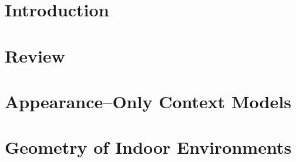 \documentclass[a4paper,11pt]{report}
\begin{document}
\pagestyle{empty}
\setcounter{page}{1}

\def\localpath{frontmatter}

\sglspace


\setcounter{tocdepth}{4}
\tableofcontents
\newpage

\newpage

\newpage


\newpage
\setcounter{page}{0}
\pagestyle{thesisheadings}

%
\def\localpath{Introduction}
\graphicspath{{\localpath/figures/}}
\chapter{Introduction}
\label{chap:intro}


%
\def\localpath{Review}
\graphicspath{{\localpath/figures/}}
\chapter{Review}
\label{chap:review}


%
\def\localpath{AppearanceOnly}
\graphicspath{{\localpath/figures/}}
\chapter{Appearance--Only Context Models}
\label{chap:appearance-only}


%
\def\localpath{Geometry}
\graphicspath{{\localpath/figures/}}
\chapter{Geometry of Indoor Environments}
\label{chap:geometry}

\end{document}
